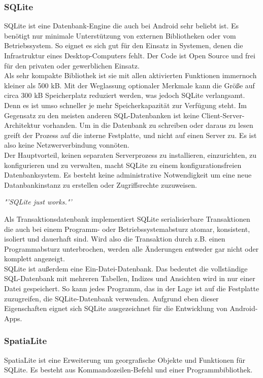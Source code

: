 \subsubsection{SQLite}
SQLite ist eine Datenbank-Engine die auch bei Android sehr beliebt ist. Es benötigt nur minimale Unterstützung von externen Bibliotheken oder vom Betriebssystem. So eignet es sich gut für den Einsatz in Systemen, denen die Infrastruktur eines Desktop-Computers fehlt. Der Code ist Open Source und frei für den privaten oder gewerblichen Einsatz.\\
Als sehr kompakte Bibliothek ist sie mit allen aktivierten Funktionen immernoch kleiner als 500 kB. Mit der Weglassung optionaler Merkmale kann die Größe auf circa 300 kB Speicherplatz reduziert werden, was jedoch SQLite verlangsamt. Denn es ist umso schneller je mehr Speicherkapazität zur Verfügung steht.
Im Gegensatz zu den meisten anderen \gls{SQL}-Datenbanken ist keine Client-Server-Architektur vorhanden. Um in die Datenbank zu schreiben oder daraus zu lesen greift der Prozess auf die interne Festplatte, und nicht auf einen Server zu. Es ist also keine Netzwerverbindung vonnöten. \\
Der Hauptvorteil, keinen separaten Serverprozess zu installieren, einzurichten, zu konfigurieren und zu verwalten, macht SQLite zu einem konfigurationsfreien Datenbanksystem. Es besteht keine administrative Notwendigkeit um eine neue Datanbankinstanz zu erstellen oder Zugriffsrechte zuzuweisen. 
\begin{center}
\textit{\color{gray}"'SQLite just works."'}\hspace{9pt}\cite{sqlitea}
\end{center}
Als Transaktionsdatenbank implementiert SQLite serialisierbare Transaktionen die auch bei einem Programm- oder Betriebssystemabsturz atomar, konsistent, isoliert und dauerhaft sind. Wird also die Transaktion durch z.B. einen Programmabsturz unterbrochen, werden alle Änderungen entweder gar nicht oder komplett angezeigt.\\ 
SQLite ist außerdem eine Ein-Datei-Datenbank. Das bedeutet die vollständige \gls{SQL}-Datenbank mit mehreren Tabellen, Indizes und Ansichten wird in nur einer Datei gespeichert. So kann jedes Programm, das in der Lage ist auf die Festplatte zuzugreifen, die SQLite-Datenbank verwenden. \cite{sqlite} Aufgrund eben dieser Eigenschaften eignet sich SQLite ausgezeichnet für die Entwicklung von Android-\glspl{App}.
\subsubsection{SpatiaLite}
SpatiaLite ist eine Erweiterung um georgrafische Objekte und Funktionen für SQLite. Es besteht aus Kommandozeilen-Befehl und einer Programmbibliothek. 
